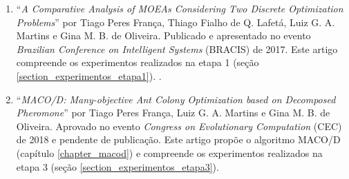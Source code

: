 \begin{enumerate}
	\item ``\textit{A Comparative Analysis of MOEAs Considering Two Discrete Optimization Problems}'' por Tiago Peres França, Thiago Fialho de Q. Lafetá, Luiz G. A. Martins e Gina M. B. de Oliveira. Publicado e apresentado no evento \textit{Brazilian Conference on Intelligent Systems} (BRACIS) de 2017. Este artigo compreende os experimentos realizados na etapa 1 (seção \ref{section_experimentos_etapa1}). \cite{Franca2017}.
	\item ``\textit{MACO/D: Many-objective Ant Colony Optimization based on Decomposed
		Pheromone}'' por Tiago Peres França, Luiz G. A. Martins e Gina M. B. de Oliveira. Aprovado no evento \textit{Congress on Evolutionary Computation} (CEC) de 2018 e pendente de publicação. Este artigo propõe o algoritmo MACO/D (capítulo \ref{chapter_macod}) e compreende os experimentos realizados na etapa 3 (seção \ref{section_experimentos_etapa3}).
\end{enumerate}